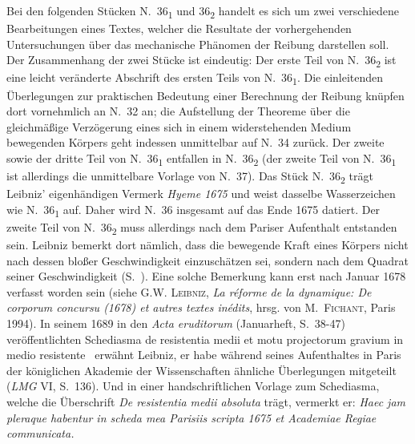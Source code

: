 \footnotesize 
\pstart 
\noindent               
Bei den folgenden St\"{u}cken N.~36\textsubscript{1} und 36\textsubscript{2} handelt es sich um zwei verschiedene Bearbeitungen eines Textes,
welcher die Resultate der vorhergehenden Untersuchungen \"{u}ber das mechanische Ph\"{a}nomen der Reibung darstellen soll.
Der Zusammenhang der zwei St\"{u}cke ist eindeutig:
Der erste Teil von N.~36\textsubscript{2} ist eine leicht ver\"{a}nderte Abschrift des ersten Teils von N.~36\textsubscript{1}.
Die einleitenden \"{U}berlegungen zur praktischen Bedeutung einer Berechnung der Reibung kn\"{u}pfen dort vornehmlich an N.~32 an;
die Aufstellung der Theoreme \"{u}ber die gleichm\"{a}{\ss}ige Verz\"{o}gerung eines sich in einem widerstehenden Medium bewegenden K\"{o}rpers geht indessen unmittelbar auf N.~34 zur\"{u}ck.
Der zweite sowie der dritte Teil von N.~36\textsubscript{1} entfallen in N.~36\textsubscript{2}
(der zweite Teil von N.~36\textsubscript{1} ist allerdings die unmittelbare Vorlage von N.~37).
Das St\"{u}ck N.~36\textsubscript{2} tr\"{a}gt Leibniz' eigenh\"{a}ndigen Vermerk \textit{Hyeme 1675} und weist dasselbe Wasserzeichen wie N.~36\textsubscript{1} auf.
Daher wird N.~36 insgesamt auf das Ende 1675 datiert.
\newline%
\indent%
Der zweite Teil von N.~36\textsubscript{2} muss allerdings nach dem Pariser Aufenthalt entstanden sein.
Leibniz bemerkt dort nämlich, dass die bewegende Kraft eines Körpers nicht nach dessen bloßer Geschwin\-dig\-keit einzuschätzen sei,
sondern nach dem Quadrat seiner Geschwindigkeit (S.~).
Eine solche Bemerkung kann erst nach Januar 1678 verfasst worden sein
(siehe \cite{01056}\textsc{G.W. Leibniz}, \textit{La réforme de la dynamique: De corporum concursu (1678) et autres textes inédits}, hrsg. von \textsc{M.~Fichant}, Paris 1994).
\newline%
\indent%
In seinem 1689 in den \cite{01023}\textit{Acta eruditorum} (Januarheft, S.~38-47) veröffentlichten
\cite{01024}\glqq Schediasma de resistentia medii et motu projectorum gravium in medio resistente\grqq~%
erwähnt Leibniz,
er habe während seines Aufenthaltes in Paris\protect{} der königlichen Akademie der Wissenschaften ähnliche Überlegungen mitgeteilt
(\cite{01025}\textit{LMG} VI, S.~136).
Und in einer handschriftlichen Vorlage zum \glqq Schediasma\grqq,
welche die Überschrift \cite{01026}\textit{De resistentia medii absoluta} trägt,
vermerkt er:
\textit{Haec jam pleraque habentur in scheda mea Parisiis\protect{} scripta 1675 et Academiae Regiae communicata.}

